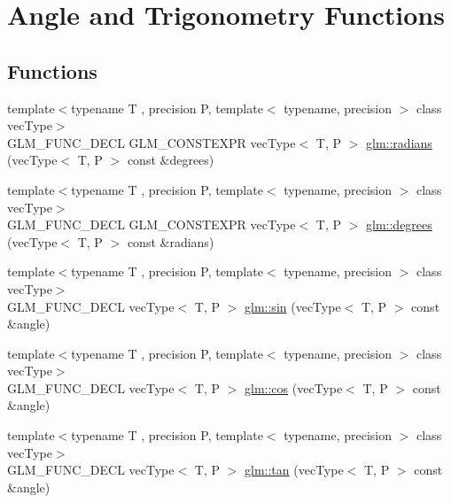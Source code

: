 \hypertarget{group__core__func__trigonometric}{}\section{Angle and Trigonometry Functions}
\label{group__core__func__trigonometric}
\subsection*{Functions}
\begin{DoxyCompactItemize}
\item 
{\footnotesize template$<$typename T , precision P, template$<$ typename, precision $>$ class vec\+Type$>$ }\\G\+L\+M\+\_\+\+F\+U\+N\+C\+\_\+\+D\+E\+CL G\+L\+M\+\_\+\+C\+O\+N\+S\+T\+E\+X\+PR vec\+Type$<$ T, P $>$ \hyperlink{group__core__func__trigonometric_gafffb5e533f75318bdf4e0967d8a6c05c}{glm\+::radians} (vec\+Type$<$ T, P $>$ const \&degrees)
\item 
{\footnotesize template$<$typename T , precision P, template$<$ typename, precision $>$ class vec\+Type$>$ }\\G\+L\+M\+\_\+\+F\+U\+N\+C\+\_\+\+D\+E\+CL G\+L\+M\+\_\+\+C\+O\+N\+S\+T\+E\+X\+PR vec\+Type$<$ T, P $>$ \hyperlink{group__core__func__trigonometric_gabccdcc282134fd62af0ff3d6e4bb21f1}{glm\+::degrees} (vec\+Type$<$ T, P $>$ const \&radians)
\item 
{\footnotesize template$<$typename T , precision P, template$<$ typename, precision $>$ class vec\+Type$>$ }\\G\+L\+M\+\_\+\+F\+U\+N\+C\+\_\+\+D\+E\+CL vec\+Type$<$ T, P $>$ \hyperlink{group__core__func__trigonometric_ga4a0ddceb6b1e64ce0e4da209dcb021d5}{glm\+::sin} (vec\+Type$<$ T, P $>$ const \&angle)
\item 
{\footnotesize template$<$typename T , precision P, template$<$ typename, precision $>$ class vec\+Type$>$ }\\G\+L\+M\+\_\+\+F\+U\+N\+C\+\_\+\+D\+E\+CL vec\+Type$<$ T, P $>$ \hyperlink{group__core__func__trigonometric_ga728fd86f14609e37d83f82429995b7b3}{glm\+::cos} (vec\+Type$<$ T, P $>$ const \&angle)
\item 
{\footnotesize template$<$typename T , precision P, template$<$ typename, precision $>$ class vec\+Type$>$ }\\G\+L\+M\+\_\+\+F\+U\+N\+C\+\_\+\+D\+E\+CL vec\+Type$<$ T, P $>$ \hyperlink{group__core__func__trigonometric_gab3ae890c38b7d3aa4d5e00998fd296b2}{glm\+::tan} (vec\+Type$<$ T, P $>$ const \&angle)

\end{DoxyCompactItemize}
